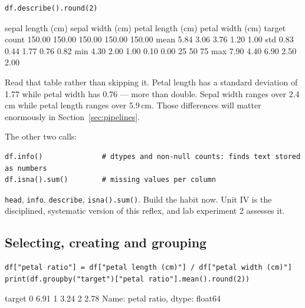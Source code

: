 \documentclass[11pt]{article}
\begin{document}
\begin{lstlisting}
df.describe().round(2)
\end{lstlisting}
\begin{codeout}
       sepal length (cm)  sepal width (cm)  petal length (cm)  petal width (cm)  target
count             150.00            150.00             150.00            150.00  150.00
mean                5.84              3.06               3.76              1.20    1.00
std                 0.83              0.44               1.77              0.76    0.82
min                 4.30              2.00               1.00              0.10    0.00
25%
50%
75%
max                 7.90              4.40               6.90              2.50    2.00
\end{codeout}

Read that table rather than skipping it. Petal length has a standard deviation of
1.77 while petal width has 0.76 --- more than double. Sepal width ranges over
2.4\,cm while petal length ranges over 5.9\,cm. Those differences will matter
enormously in Section~\ref{sec:pipelines}.

The other two calls:

\begin{lstlisting}
df.info()              # dtypes and non-null counts: finds text stored as numbers
df.isna().sum()        # missing values per column
\end{lstlisting}

\begin{keyidea}
\texttt{head}, \texttt{info}, \texttt{describe}, \texttt{isna().sum()}. Build
the habit now. Unit IV is the disciplined, systematic version of this reflex,
and lab experiment 2 assesses it.
\end{keyidea}

\subsection{Selecting, creating and grouping}

\begin{lstlisting}
df["petal ratio"] = df["petal length (cm)"] / df["petal width (cm)"]
print(df.groupby("target")["petal ratio"].mean().round(2))
\end{lstlisting}
\begin{codeout}
target
0    6.91
1    3.24
2    2.78
Name: petal ratio, dtype: float64
\end{codeout}
\end{document}
